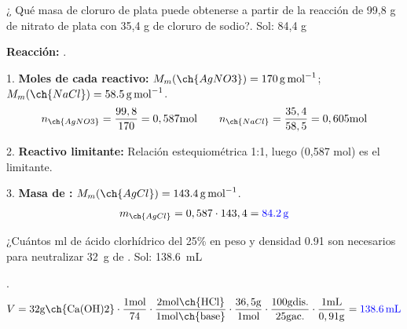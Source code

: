 \begin{exercise}
    ¿ Qué masa de cloruro de plata puede obtenerse a partir de la reacción de 99,8 g de nitrato de plata con 35,4 g de cloruro de sodio?. Sol: 84,4 g
    \begin{solu}
        \textbf{Reacción:} .

        1. \textbf{Moles de cada reactivo:} $M_m(\ch{AgNO3}) = \qty{170}{\g\per\mol}$; $M_m(\ch{NaCl}) = \qty{58,5}{\g\per\mol}$.
        \[ n_{\ch{AgNO3}} = \dfrac{99,8}{170} = 0,587 \si{\mol} \qquad n_{\ch{NaCl}} = \dfrac{35,4}{58,5} = 0,605 \si{\mol} \]

        2. \textbf{Reactivo limitante:} Relación estequiométrica 1:1, luego  (0,587 mol) es el limitante.

        3. \textbf{Masa de :} $M_m(\ch{AgCl}) = \qty{143,4}{\g\per\mol}$.
        \[ m_{\ch{AgCl}} = 0,587 \cdot 143,4 = \mathbf{\textcolor{blue}{\qty{84,2}{\g}}} \]
    \end{solu}
\end{exercise}

\begin{exercise}
    ¿Cuántos \unit{\ml} de ácido clorhídrico del 25\% en peso y densidad \qty{0.91}{\gpml}  son necesarios para neutralizar \qty{32}{\g} de . Sol: \qty{138.6}{\mL}
    \begin{solu}
        .
        \[ V = 32 \si{\g \ch{Ca(OH)2}} \cdot \dfrac{1 \si{\mol}}{74} \cdot \dfrac{2 \si{\mol \ch{HCl}}}{1 \si{\mol \ch{base}}} \cdot \dfrac{36,5 \si{\g}}{1 \si{\mol}} \cdot \dfrac{100 \si{\g \text{ dis.}}}{25 \si{\g \text{ ac.}}} \cdot \dfrac{1 \si{\mL}}{0,91 \si{\g}} = \mathbf{\textcolor{blue}{\qty{138,6}{\mL}}} \]
    \end{solu}
\end{exercise}

